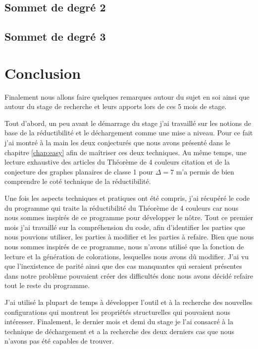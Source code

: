 \documentclass[10pt,a4paper]{article}
\begin{document}
\subsection{Sommet de degré 2}
\subsection{Sommet de degré 3}

\section{Conclusion}
\label{chap:concl}
Finalement nous allons faire quelques remarques autour du sujet en soi ainsi que autour du stage de recherche et leurs apports lors de ces 5 mois de stage.

Tout d'abord, un peu avant le démarrage du stage j'ai travaillé sur les notions de base de la réductibilité et le déchargement comme une mise a niveau. Pour ce fait j'ai montré à la main les deux conjecturés que nous avons présenté dans le chapitre \ref{chap:easy} afin de maîtriser ces deux techniques. Au même temps, une lecture exhaustive des articles du Théorème de 4 couleurs {\color{blue}citation} et de la conjecture des graphes planaires de classe 1 pour $\Delta = 7$ \cite{SandersZhao} m'a permis de bien comprendre le coté technique de la réductibilité. 

Une fois les aspects techniques et pratiques ont été compris, j'ai récupéré le code du programme qui traite la réductibilité du Théorème de 4 couleurs car nous nous sommes inspirés de ce programme pour développer le nôtre. Tout ce premier mois j'ai travaillé sur la compréhension du code, afin d'identifier les parties que nous pouvions utiliser, les parties à modifier et les parties à refaire. Bien que nous nous sommes inspirés de ce programme, nous n'avons utilisé que la fonction de lecture et la génération de colorations, lesquelles nous avons dû modifier. J'ai vu que l'inexistence de parité ainsi que des cas manquantes qui seraient présentes dans notre problème pouvaient créer des difficultés donc nous avons décidé refaire tout le reste du programme.

J'ai utilisé la plupart de temps à développer l'outil et à la recherche des nouvelles configurations qui montrent les propriétés structurelles qui pouvaient nous intéresser. Finalement, le dernier mois et demi du stage je l'ai consacré à la technique de déchargement et a la recherche des deux derniers cas que nous n'avons pas été capables de trouver.
\end{document}
